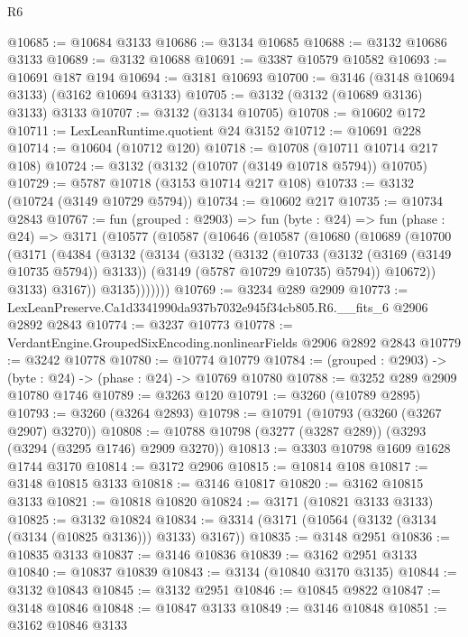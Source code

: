 \begin{lexlean}{R6}
\begin{coremodule}
@10685 := @10684 @3133
@10686 := @3134 @10685
@10688 := @3132 @10686 @3133
@10689 := @3132 @10688
@10691 := @3387 @10579 @10582
@10693 := @10691 @187 @194
@10694 := @3181 @10693
@10700 := @3146 (@3148 @10694 @3133) (@3162 @10694 @3133)
@10705 := @3132 (@3132 (@10689 @3136) @3133) @3133
@10707 := @3132 (@3134 @10705)
@10708 := @10602 @172
@10711 := LexLeanRuntime.quotient @24 @3152
@10712 := @10691 @228
@10714 := @10604 (@10712 @120)
@10718 := @10708 (@10711 @10714 @217 @108)
@10724 := @3132 (@3132 (@10707 (@3149 @10718 @5794)) @10705)
@10729 := @5787 @10718 (@3153 @10714 @217 @108)
@10733 := @3132 (@10724 (@3149 @10729 @5794))
@10734 := @10602 @217
@10735 := @10734 @2843
@10767 := fun (grouped : @2903) =>
  fun (byte : @24) =>
  fun (phase : @24) =>
  @3171
    (@10577
      (@10587
        (@10646
          (@10587
            (@10680
              (@10689
                (@10700
                  (@3171
                    (@4384
                      (@3132
                        (@3134
                          (@3132
                            (@3132
                              (@10733 (@3132 (@3169 (@3149 @10735 @5794)) @3133))
                              (@3149 (@5787 @10729 @10735) @5794))
                            @10672))
                        @3133)
                      @3167))
                  @3135)))))))
@10769 := @3234 @289 @2909
@10773 := LexLeanPreserve.Ca1d3341990da937b7032e945f34cb805.R6.__fits_6 @2906 @2892 @2843
@10774 := @3237 @10773
@10778 := VerdantEngine.GroupedSixEncoding.nonlinearFields @2906 @2892 @2843
@10779 := @3242 @10778
@10780 := @10774 @10779
@10784 := (grouped : @2903) -> (byte : @24) -> (phase : @24) -> @10769 @10780
@10788 := @3252 @289 @2909 @10780 @1746
@10789 := @3263 @120
@10791 := @3260 (@10789 @2895)
@10793 := @3260 (@3264 @2893)
@10798 := @10791 (@10793 (@3260 (@3267 @2907) @3270))
@10808 := @10788 @10798 (@3277 (@3287 @289)) (@3293 (@3294 (@3295 @1746) @2909 @3270))
@10813 := @3303 @10798 @1609 @1628 @1744 @3170
@10814 := @3172 @2906
@10815 := @10814 @108
@10817 := @3148 @10815 @3133
@10818 := @3146 @10817
@10820 := @3162 @10815 @3133
@10821 := @10818 @10820
@10824 := @3171 (@10821 @3133 @3133)
@10825 := @3132 @10824
@10834 := @3314 (@3171 (@10564 (@3132 (@3134 (@3134 (@10825 @3136))) @3133) @3167))
@10835 := @3148 @2951
@10836 := @10835 @3133
@10837 := @3146 @10836
@10839 := @3162 @2951 @3133
@10840 := @10837 @10839
@10843 := @3134 (@10840 @3170 @3135)
@10844 := @3132 @10843
@10845 := @3132 @2951
@10846 := @10845 @9822
@10847 := @3148 @10846
@10848 := @10847 @3133
@10849 := @3146 @10848
@10851 := @3162 @10846 @3133

\end{coremodule}
\end{lexlean}
